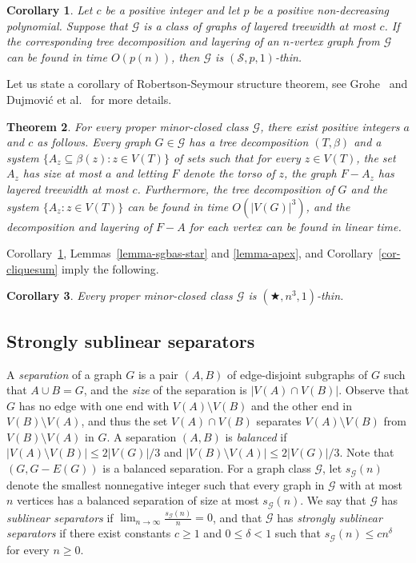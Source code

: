 \documentclass[a4paper,11pt]{article}
\newcommand{\GG}{{\mathcal G}}
\newcommand{\Ss}{{\mathcal S}}
\newtheorem{theorem}{Theorem}[section]
\newtheorem{corollary}[theorem]{Corollary}
\begin{document}
\begin{corollary}\label{cor-layertw}
Let $c$ be a positive integer and let $p$ be a positive non-decreasing polynomial.
Suppose that $\GG$ is a class of graphs of layered treewidth at most $c$.
If the corresponding tree decomposition and layering of an $n$-vertex graph from $\GG$ can be found in time $O(p(n))$,
then $\GG$ is $(\Ss,p,1)$-thin.
\end{corollary}

Let us state a corollary of Robertson-Seymour structure theorem, see Grohe~\cite{grohe2003local} and
Dujmovi\'{c} et al.~\cite{layers} for more details.
\begin{theorem}\label{thm-struct}
For every proper minor-closed class $\GG$, there exist positive integers $a$ and $c$ as follows.
Every graph $G\in\GG$ has a tree decomposition $(T,\beta)$ and a system $\{A_z\subseteq \beta(z):z\in V(T)\}$
of sets such that for every $z\in V(T)$, the set $A_z$ has size at most $a$ and letting $F$ denote the torso of $z$,
the graph $F-A_z$ has layered treewidth at most $c$.  Furthermore, the tree decomposition of $G$
and the system $\{A_z:z\in V(T)\}$ can be found in time $O(|V(G)|^3)$, and the decomposition and layering
of $F-A$ for each vertex can be found in linear time.
\end{theorem}

Corollary~\ref{cor-layertw}, Lemmas~\ref{lemma-sgbas-star} and \ref{lemma-apex}, and Corollary~\ref{cor-cliquesum} imply the following.
\begin{corollary}\label{cor-minor}
Every proper minor-closed class $\GG$ is $(\bigstar,n^3,1)$-thin.
\end{corollary}

\subsection{Strongly sublinear separators}

A \emph{separation} of a graph $G$ is a pair $(A,B)$ of edge-disjoint subgraphs of $G$ such that $A\cup B=G$,
and the \emph{size} of the separation is $|V(A)\cap V(B)|$.  Observe that $G$ has no edge with one end with $V(A)\setminus V(B)$
and the other end in $V(B)\setminus V(A)$, and thus the set $V(A)\cap V(B)$ separates $V(A)\setminus V(B)$ from
$V(B)\setminus V(A)$ in $G$.
A separation $(A,B)$ is \emph{balanced} if $|V(A)\setminus V(B)|\le 2|V(G)|/3$ and $|V(B)\setminus V(A)|\le 2|V(G)|/3$.
Note that $(G,G-E(G))$ is a balanced separation.
For a graph class $\GG$, let $s_\GG(n)$ denote the smallest nonnegative integer such that every graph in $\GG$ with at most $n$ vertices
has a balanced separation of size at most $s_\GG(n)$.  We say that $\GG$ has \emph{sublinear separators} if
$\lim_{n\to\infty} \frac{s_\GG(n)}{n}=0$, and that $\GG$ has \emph{strongly sublinear separators} if
there exist constants $c\ge 1$ and $0\le \delta<1$ such that $s_\GG(n)\le cn^\delta$ for every $n\ge 0$.
\end{document}
